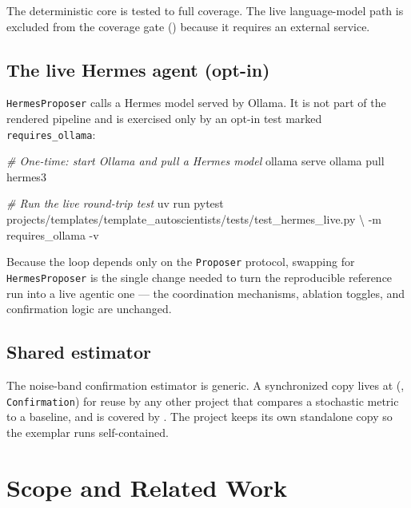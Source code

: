 \documentclass[
]{article}
\newenvironment{Shaded}{}{}
\newcommand{\AttributeTok}[1]{\textcolor[rgb]{0.49,0.56,0.16}{#1}}
\newcommand{\CommentTok}[1]{\textcolor[rgb]{0.38,0.63,0.69}{\textit{#1}}}
\newcommand{\DataTypeTok}[1]{\textcolor[rgb]{0.56,0.13,0.00}{#1}}
\newcommand{\ExtensionTok}[1]{#1}
\newcommand{\NormalTok}[1]{#1}
\begin{document}
The deterministic core is tested to full coverage. The live
language-model path is excluded from the coverage gate
() because it requires an external
service.

\subsection{The live Hermes agent
(opt-in)}\label{the-live-hermes-agent-opt-in}

\texttt{HermesProposer} calls a Hermes model served by Ollama. It is not
part of the rendered pipeline and is exercised only by an opt-in test
marked \texttt{requires\_ollama}:

\begin{Shaded}
\begin{Highlighting}[]
\CommentTok{\# One{-}time: start Ollama and pull a Hermes model}
\ExtensionTok{ollama}\NormalTok{ serve}
\ExtensionTok{ollama}\NormalTok{ pull hermes3}

\CommentTok{\# Run the live round{-}trip test}
\ExtensionTok{uv}\NormalTok{ run pytest projects/templates/template\_autoscientists/tests/test\_hermes\_live.py }\DataTypeTok{\textbackslash{}}
    \AttributeTok{{-}m}\NormalTok{ requires\_ollama }\AttributeTok{{-}v}
\end{Highlighting}
\end{Shaded}

Because the loop depends only on the \texttt{Proposer} protocol,
swapping  for \texttt{HermesProposer} is
the single change needed to turn the reproducible reference run into a
live agentic one --- the coordination mechanisms, ablation toggles, and
confirmation logic are unchanged.

\subsection{Shared estimator}\label{shared-estimator}

The noise-band confirmation estimator is generic. A synchronized copy
lives at 
(, \texttt{Confirmation}) for reuse by any
other project that compares a stochastic metric to a baseline, and is
covered by .
The project keeps its own standalone copy so the exemplar runs
self-contained.

\newpage

\section{Scope and Related Work}\label{sec:scope}
\end{document}
